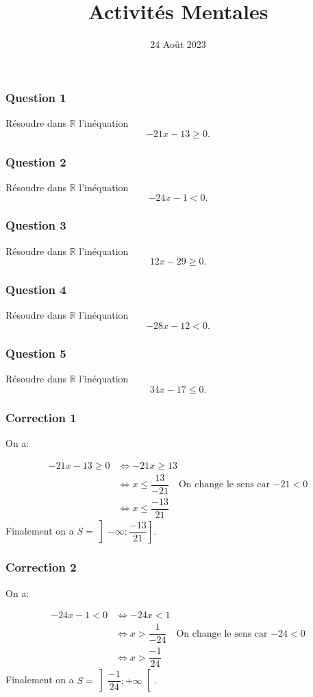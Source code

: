 \documentclass[15pt, mathserif]{beamer}
\title{Activités Mentales}
\date{24 Août 2023}
\begin{document}
\begin{frame}
    \titlepage
\end{frame}

\begin{frame} 
	\frametitle{Question 1}
Résoudre dans $\mathbb{R}$ l'inéquation \[-21x-13\geq 0.\]\end{frame}


\begin{frame} 
	\frametitle{Question 2}
Résoudre dans $\mathbb{R}$ l'inéquation \[-24x-1< 0.\]\end{frame}


\begin{frame} 
	\frametitle{Question 3}
Résoudre dans $\mathbb{R}$ l'inéquation \[12x-29\geq 0.\]\end{frame}


\begin{frame} 
	\frametitle{Question 4}
Résoudre dans $\mathbb{R}$ l'inéquation \[-28x-12< 0.\]\end{frame}


\begin{frame} 
	\frametitle{Question 5}
Résoudre dans $\mathbb{R}$ l'inéquation \[34x-17\leq 0.\]\end{frame}


\begin{frame}
\vspace{-10mm}
	\frametitle{Correction 1}
On a:

\begin{align*}
	-21x-13\geq 0 & \Leftrightarrow -21x\geq13\\
	 & \Leftrightarrow x\leq\dfrac{13}{-21} \quad \text{On change le sens car $-21<0$}\\
	 & \Leftrightarrow x\leq\dfrac{-13}{21}
\end{align*}Finalement on a $S = \left]-\infty;\dfrac{-13}{21}\right]$.\end{frame}


\begin{frame}
\vspace{-10mm}
	\frametitle{Correction 2}
On a:

\begin{align*}
	-24x-1< 0 & \Leftrightarrow -24x<1\\
	 & \Leftrightarrow x>\dfrac{1}{-24} \quad \text{On change le sens car $-24<0$}\\
	 & \Leftrightarrow x>\dfrac{-1}{24}
\end{align*}Finalement on a $S = \left]\dfrac{-1}{24};+\infty\right[$.\end{frame}
\end{document}
